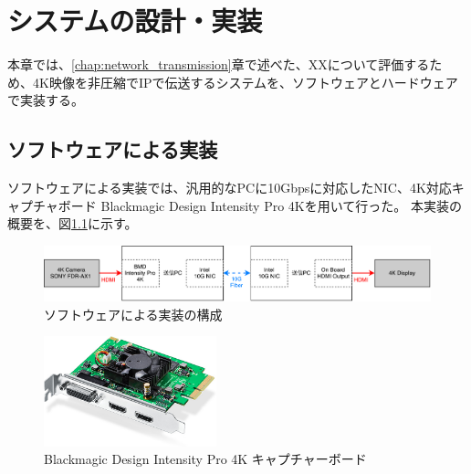 \chapter{システムの設計・実装}
\label{chap:implementation}

本章では、\ref{chap:network_transmission}章で述べた、XXについて評価するため、4K映像を非圧縮でIPで伝送するシステムを、ソフトウェアとハードウェアで実装する。



\section{ソフトウェアによる実装}

ソフトウェアによる実装では、汎用的なPCに10Gbpsに対応したNIC、4K対応キャプチャボード Blackmagic Design Intensity Pro 4Kを用いて行った。
本実装の概要を、図\ref{fig:software-implement-flow}に示す。

\begin{figure}[htbp]
    \begin{center}
        \includegraphics[bb=0 0 841 121,width=15.5cm]{img/software-implement-flow.pdf}
    \end{center}
    \caption{ソフトウェアによる実装の構成}
    \label{fig:software-implement-flow}
\end{figure}

\begin{figure}[htbp]
    \begin{center}
        \includegraphics[bb=0 0 644 410,width=5cm]{img/bmd-intensity-pro-4k.jpg}
    \end{center}
    \caption{Blackmagic Design Intensity Pro 4K キャプチャーボード}
    \label{fig:ted-4k-fmc-card}
\end{figure}

